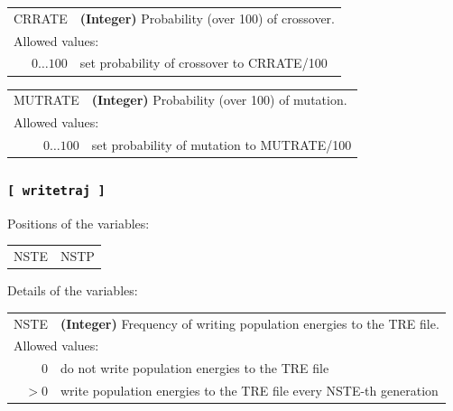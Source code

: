 \documentclass[10pt,a4paper,openany]{memoir}
\numberwithin{equation}{section}
\begin{document}
{
\begin{tabular}{r@{ : }l}
\label{descr:crrate}
    CRRATE&\textbf{(Integer)} Probability (over 100) of crossover.                                                                 \\ 
\multicolumn{2}{l}{Allowed values:} \\ 
\(0\ldots 100\)&set probability of crossover to CRRATE/100                                                           \\ 
\end{tabular}
\vspace{1ex}
}

{
\begin{tabular}{r@{ : }l}
\label{descr:mutrate}
   MUTRATE&\textbf{(Integer)} Probability (over 100) of mutation.                                                                  \\ 
\multicolumn{2}{l}{Allowed values:} \\ 
\(0\ldots 100\)&set probability of mutation to MUTRATE/100                                                           \\ 
\end{tabular}
\vspace{1ex}
}

\subsubsection{\texttt{[~writetraj~]}}
\label{sec:inp-writetraj}

Positions of the variables:
\begin{center}
  \begin{tabular}{ll}
    NSTE & NSTP \\
  \end{tabular}
\end{center}

\noindent Details of the variables:
\vspace{2ex}

{
\begin{tabular}{r@{ : }l}
\label{descr:nste}
      NSTE&\textbf{(Integer)} Frequency of writing population energies to the TRE file.                                                \\ 
\multicolumn{2}{l}{Allowed values:} \\ 
     \(0\)&do not write population energies to the TRE file                                                     \\ 
    \(>0\)&write population energies to the TRE file every NSTE-th generation                                   \\ 
\end{tabular}
\vspace{1ex}
}
\end{document}
